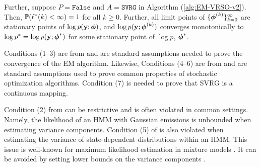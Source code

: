 \begin{theorem}
    Further, suppose $P = \texttt{False}$ and $A = \texttt{SVRG}$ in Algorithm (\ref{alg:EM-VRSO-v2}). Then, $\mathbb{P}(\ell^*(k) < \infty) = 1$ for all $k \geq 0$. Further, all limit points of $\{\boldsymbol{\phi}^{(k)}\}_{k=0}^\infty$  are stationary points of $\log p(\mathbf{y};\boldsymbol{\phi})$, and $\log p(\mathbf{y};\boldsymbol{\phi}^{(k)})$ converges monotonically to $\log p^* = \log p(\mathbf{y};\boldsymbol{\phi}^*)$ for some stationary point of $\log p$, $\boldsymbol{\phi}^*$.
\end{theorem}
%




Conditions (1--3) are from \citet{Wu:1983} and are standard assumptions needed to prove the convergence of the EM algorithm. Likewise, Conditions (4--6) are from \citet{Johnson:2013} and are standard assumptions used to prove common properties of stochastic optimization algorithms. Condition (7) is needed to prove that SVRG is a continuous mapping.

Condition (2) from \citet{Wu:1983} can be restrictive and is often violated in common settings. Namely, the likelihood of an HMM with Gaussian emissions is unbounded when estimating variance components. Condition (5) of \citet{Johnson:2013} is also violated when estimating the variance of state-dependent distributions within an HMM. This issue is well-known for maximum likelihood estimation in mixture models \citep{Chen:2009,Liu:2015b}. It can be avoided by setting lower bounds on the variance components \citep{Zucchini:2016}. %


